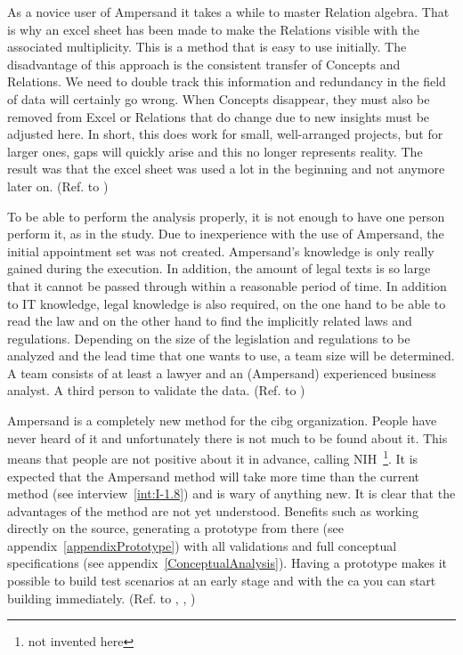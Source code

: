 As a novice user of Ampersand it takes a while to master Relation algebra.
That is why an excel sheet has been made to make the Relations visible with the associated multiplicity.
This is a method that is easy to use initially.
The disadvantage of this approach is the consistent transfer of Concepts and Relations.
We need to double track this information and redundancy in the field of data will certainly go wrong.
When Concepts disappear, they must also be removed from Excel or Relations that do change due to new insights must be adjusted here.
In short, this does work for small, well-arranged projects, but for larger ones, gaps will quickly arise and this no longer represents reality.
The result was that the excel sheet was used a lot in the beginning and not anymore later on.
(Ref. to )


To be able to perform the analysis properly, it is not enough to have one person perform it, as in the study.
Due to inexperience with the use of Ampersand, the initial appointment set was not created.
Ampersand's knowledge is only really gained during the execution.
In addition, the amount of legal texts is so large that it cannot be passed through within a reasonable period of time.
In addition to IT knowledge, legal knowledge is also required, on the one hand to be able to read the law and on the other hand to find the implicitly related laws and regulations.
Depending on the size of the legislation and regulations to be analyzed and the lead time that one wants to use, a team size will be determined.
A team consists of at least a lawyer and an (Ampersand) experienced business analyst.
A third person to validate the data.
(Ref. to )


Ampersand is a completely new method for the \acrshort{cibg} organization.
People have never heard of it and unfortunately there is not much to be found about it.
This means that people are not positive about it in advance, calling NIH~\footnote{not invented here}\citep{antons_assessing_2017}.
It is expected that the Ampersand method will take more time than the current method (see interview~\ref{int:I-1.8}) and is wary of anything new.
It is clear that the advantages of the method are not yet understood.
Benefits such as working directly on the source, generating a prototype from there (see appendix~\ref{appendixPrototype}) with all validations and full conceptual specifications (see appendix~\ref{ConceptualAnalysis}).
Having a prototype makes it possible to build test scenarios at an early stage and with the \acrlong{ca} you can start building immediately.
(Ref. to , , )


